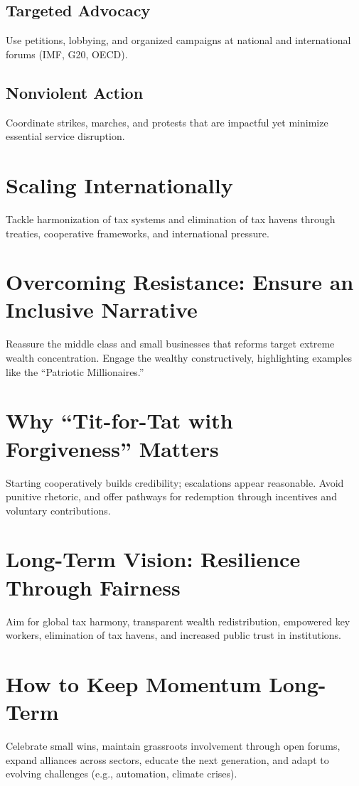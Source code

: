 \documentclass[11pt,a4paper]{article}
\begin{document}
\subsection{Targeted Advocacy}
Use petitions, lobbying, and organized campaigns at national and international forums (IMF, G20, OECD).

\subsection{Nonviolent Action}
Coordinate strikes, marches, and protests that are impactful yet minimize essential service disruption.

\section{Scaling Internationally}
Tackle harmonization of tax systems and elimination of tax havens through treaties, cooperative frameworks, and international pressure.

\section{Overcoming Resistance: Ensure an Inclusive Narrative}
Reassure the middle class and small businesses that reforms target extreme wealth concentration. Engage the wealthy constructively, highlighting examples like the ``Patriotic Millionaires.''

\section{Why ``Tit-for-Tat with Forgiveness'' Matters}
Starting cooperatively builds credibility; escalations appear reasonable. Avoid punitive rhetoric, and offer pathways for redemption through incentives and voluntary contributions.

\section{Long-Term Vision: Resilience Through Fairness}
Aim for global tax harmony, transparent wealth redistribution, empowered key workers, elimination of tax havens, and increased public trust in institutions.

\section{How to Keep Momentum Long-Term}
Celebrate small wins, maintain grassroots involvement through open forums, expand alliances across sectors, educate the next generation, and adapt to evolving challenges (e.g., automation, climate crises).
\end{document}
